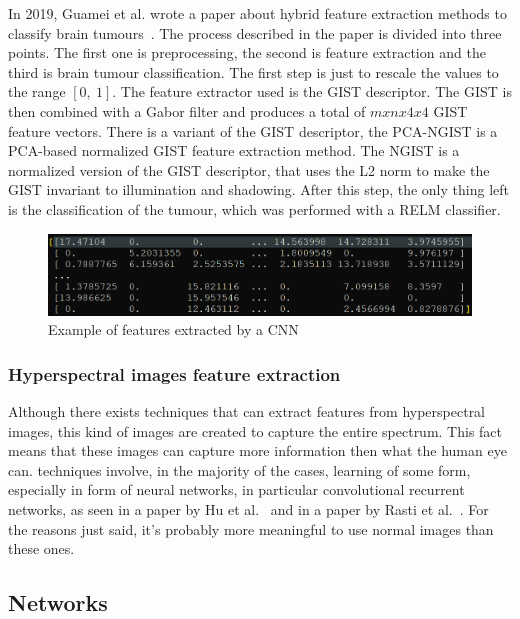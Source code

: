 \documentclass[conference]{IEEEtran}
\begin{document}
					\noindent In 2019, Guamei et al. wrote a paper about hybrid feature extraction methods to classify brain tumours~\cite{gumaei2019hybrid}. The process described in the paper is divided into three points. The 
					first one is preprocessing, the second is feature extraction and the third is brain tumour classification. The first step is just to rescale the values to the range $[0,\ 1]$. The feature extractor 
					used is the GIST descriptor. The GIST is then combined with a Gabor filter and produces a total of $mxnx4x4$ GIST feature vectors. There is a variant of the GIST descriptor, the 
					PCA-NGIST is a PCA-based normalized GIST feature extraction method. The NGIST is a normalized version of the GIST descriptor, that uses the L2 norm to make the GIST invariant to illumination and shadowing. 
					After this step, the only thing left is the classification of the tumour, which was performed with a RELM classifier. 
					
					\begin{figure}[!ht]
						\centerline{\includegraphics[width=\linewidth]{imgs/cnn_features.png}}
						\caption{Example of features extracted by a CNN}
						\label{fig:4}
					\end{figure}	
					
				\subsubsection{Hyperspectral images feature extraction}
					
					Although there exists techniques that can extract features from hyperspectral images, this kind of images are created to capture the entire spectrum. This fact means that these images can capture 
					more information then what the human eye can. techniques involve, in the majority of the cases, learning of some form, especially in form of neural networks, in particular convolutional recurrent 
					networks, as seen in a paper by Hu et al.~\cite{hu2020spatial} and in a paper by Rasti et al.~\cite{rasti2020feature}. For the reasons just said, it's probably more meaningful to use normal 
					images than these ones.
			
			\subsection{Networks}
			
\end{document}

